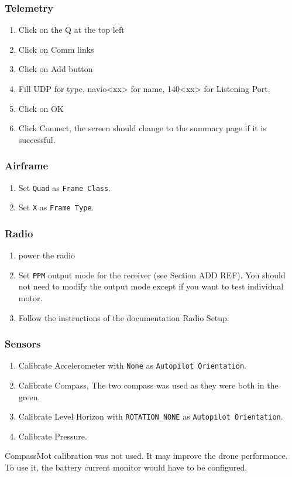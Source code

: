 \subsubsection{Telemetry}
\begin{enumerate}
    \item Click on the Q at the top left
    \item Click on Comm links
    \item Click on Add button
    \item Fill UDP for type, navio<xx> for name, 140<xx> for Listening Port.
    \item Click on OK
    \item Click Connect, the screen should change to the summary page if it is successful.
\end{enumerate}

\subsubsection{Airframe}
\begin{enumerate}
    \item Set \texttt{Quad} as \texttt{Frame Class}.
    \item Set \texttt{X} as \texttt{Frame Type}.
\end{enumerate}

\subsubsection{Radio}
\begin{enumerate}
    \item power the radio
    \item Set \texttt{PPM} output mode for the receiver (see Section ADD REF). You should not need to modify the output mode except if you want to test individual motor.
    \item Follow the instructions of the documentation Radio Setup.
\end{enumerate}

\subsubsection{Sensors}
\begin{enumerate}
    \item Calibrate Accelerometer with \texttt{None} as \texttt{Autopilot Orientation}.
    \item Calibrate Compass, The two compass was used as they were both in the green.
    \item Calibrate Level Horizon  with \texttt{ROTATION\_NONE} as \texttt{Autopilot Orientation}.
    \item Calibrate Pressure.
\end{enumerate}
CompassMot calibration was not used. It may improve the drone performance. To use it, the battery current monitor would have to be configured.

